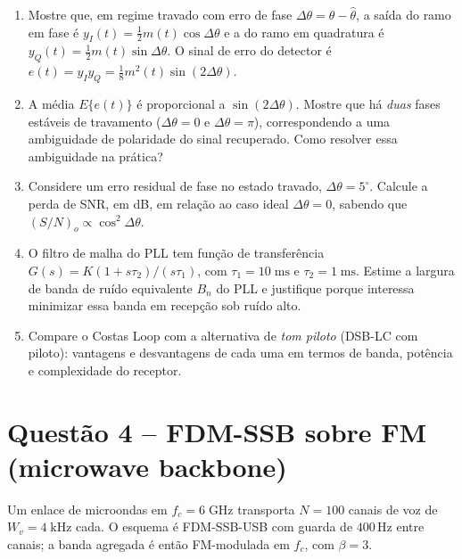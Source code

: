 \documentclass[11pt,a4paper]{article}
\begin{document}
\begin{enumerate}[label=\alph*)]
  \item Mostre que, em regime travado com erro de fase $\Delta\theta = \theta - \hat\theta$, a saída do ramo em fase é $y_I(t) = \tfrac{1}{2}m(t)\cos\Delta\theta$ e a do ramo em quadratura é $y_Q(t) = \tfrac{1}{2}m(t)\sin\Delta\theta$. O sinal de erro do detector é $e(t) = y_I y_Q = \tfrac{1}{8}m^2(t)\sin(2\Delta\theta)$.
  \item A média $E\{e(t)\}$ é proporcional a $\sin(2\Delta\theta)$. Mostre que há \emph{duas} fases estáveis de travamento ($\Delta\theta = 0$ e $\Delta\theta = \pi$), correspondendo a uma ambiguidade de polaridade do sinal recuperado. Como resolver essa ambiguidade na prática?
  \item Considere um erro residual de fase no estado travado, $\Delta\theta = 5^\circ$. Calcule a perda de SNR, em dB, em relação ao caso ideal $\Delta\theta = 0$, sabendo que $(S/N)_o \propto \cos^2\Delta\theta$.
  \item O filtro de malha do PLL tem função de transferência $G(s) = K(1 + s\tau_2)/(s\tau_1)$, com $\tau_1 = 10\;\text{ms}$ e $\tau_2 = 1\;\text{ms}$. Estime a largura de banda de ruído equivalente $B_n$ do PLL e justifique porque interessa minimizar essa banda em recepção sob ruído alto.
  \item Compare o Costas Loop com a alternativa de \emph{tom piloto} (DSB-LC com piloto): vantagens e desvantagens de cada uma em termos de banda, potência e complexidade do receptor.
\end{enumerate}

\section*{Questão 4 -- FDM-SSB sobre FM (microwave backbone)}

Um enlace de microondas em $f_c = 6\;\text{GHz}$ transporta $N = 100$ canais de voz de $W_v = 4\;\text{kHz}$ cada. O esquema é FDM-SSB-USB com guarda de $400$\,Hz entre canais; a banda agregada é então FM-modulada em $f_c$, com $\beta = 3$.
\end{document}
